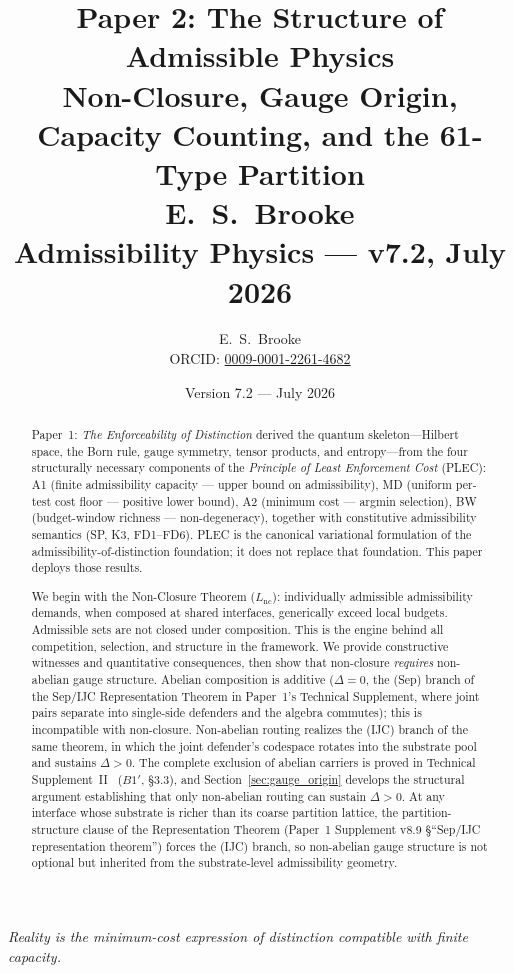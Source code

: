 \documentclass[11pt]{article}
\title{
  \textbf{Paper 2: The Structure of Admissible Physics}\\
  \large Non-Closure, Gauge Origin, Capacity Counting, and the 61-Type Partition\\
  \normalsize E.\ S.\ Brooke\\
  Admissibility Physics --- v7.2, July 2026
}
\author{E.\ S.\ Brooke \\[0.4em] \normalsize ORCID: \href{https://orcid.org/0009-0001-2261-4682}{0009-0001-2261-4682}}
\date{Version 7.2 --- July 2026}
\begin{document}
\maketitle

\bigskip

\begin{center}
\textit{Reality is the minimum-cost expression of distinction compatible with finite capacity.}
\end{center}

\bigskip

\begin{abstract}
\noindent
Paper~1: \emph{The Enforceability of Distinction} derived the quantum skeleton---Hilbert space, the Born rule, gauge symmetry, tensor products, and entropy---from the four structurally necessary components of the \emph{Principle of Least Enforcement Cost} (PLEC): A1 (finite admissibility capacity --- upper bound on admissibility), MD (uniform per-test cost floor --- positive lower bound), A2 (minimum cost --- argmin selection), BW (budget-window richness --- non-degeneracy), together with constitutive admissibility semantics (SP, K3, FD1--FD6).  PLEC is the canonical variational formulation of the admissibility-of-distinction foundation; it does not replace that foundation.  This paper deploys those results.

We begin with the Non-Closure Theorem ($L_{\mathrm{nc}}$): individually admissible admissibility demands, when composed at shared interfaces, generically exceed local budgets.  Admissible sets are not closed under composition.  This is the engine behind all competition, selection, and structure in the framework.  We provide constructive witnesses and quantitative consequences, then show that non-closure \emph{requires} non-abelian gauge structure. Abelian composition is additive ($\Delta = 0$, the (Sep) branch of the Sep/IJC Representation Theorem in Paper~1's Technical Supplement, where joint pairs separate into single-side defenders and the algebra commutes); this is incompatible with non-closure. Non-abelian routing realizes the (IJC) branch of the same theorem, in which the joint defender's codespace rotates into the substrate pool and sustains $\Delta > 0$. The complete exclusion of abelian carriers is proved in Technical Supplement~II~\cite{BrookeP2FoundSupplement} ($B1'$, \S3.3), and Section~\ref{sec:gauge_origin} develops the structural argument establishing that only non-abelian routing can sustain $\Delta > 0$.  At any interface whose substrate is richer than its coarse partition lattice, the partition-structure clause of the Representation Theorem (Paper~1 Supplement v8.9 \S``Sep/IJC representation theorem'') forces the (IJC) branch, so non-abelian gauge structure is not optional but inherited from the substrate-level admissibility geometry.


\end{abstract}
\end{document}
